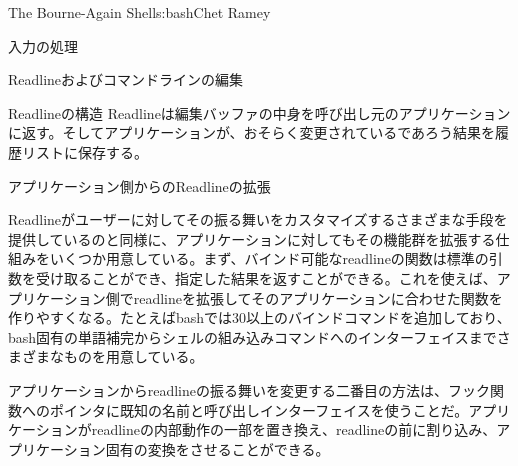\begin{aosachapter}{The Bourne-Again Shell}{s:bash}{Chet Ramey}
\begin{aosasect1}{入力の処理}
\begin{aosasect2}{Readlineおよびコマンドラインの編集}
\begin{aosasect3}{Readlineの構造}
Readlineは編集バッファの中身を呼び出し元のアプリケーションに返す。そしてアプリケーションが、おそらく変更されているであろう結果を履歴リストに保存する。

\end{aosasect3}

\begin{aosasect3}{アプリケーション側からのReadlineの拡張}

Readlineがユーザーに対してその振る舞いをカスタマイズするさまざまな手段を提供しているのと同様に、アプリケーションに対してもその機能群を拡張する仕組みをいくつか用意している。まず、バインド可能なreadlineの関数は標準の引数を受け取ることができ、指定した結果を返すことができる。これを使えば、アプリケーション側でreadlineを拡張してそのアプリケーションに合わせた関数を作りやすくなる。たとえばbashでは30以上のバインドコマンドを追加しており、bash固有の単語補完からシェルの組み込みコマンドへのインターフェイスまでさまざまなものを用意している。

アプリケーションからreadlineの振る舞いを変更する二番目の方法は、フック関数へのポインタに既知の名前と呼び出しインターフェイスを使うことだ。アプリケーションがreadlineの内部動作の一部を置き換え、readlineの前に割り込み、アプリケーション固有の変換をさせることができる。

\end{aosasect3}

\end{aosasect2}


\end{aosasect1}
\end{aosachapter}
